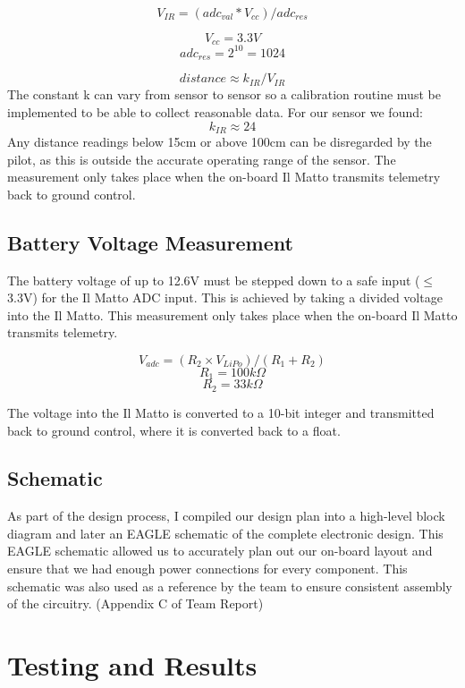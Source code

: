 \documentclass[a4paper,11pt]{article}
\begin{document}
\begin{equation}
V_{IR} = (adc_{val}*V_{cc})/adc_{res}
\label{eqn:IR Voltage}
\end{equation}

\[V_{cc} = 3.3V\]
\[adc_{res} = 2^{10} = 1024\]

\begin{equation}
distance \approx k_{IR}/V_{IR}
\label{eqn:IR Distance}
\end{equation}
The constant k can vary from sensor to sensor so a calibration routine must be implemented to be able to collect reasonable data. For our sensor we found: \[k_{IR}\approx24\] Any distance readings below 15cm or above 100cm can be disregarded by the pilot, as this is outside the accurate operating range of the sensor. The measurement only takes place when the on-board Il Matto transmits telemetry back to ground control.

\subsection{Battery Voltage Measurement}
The battery voltage of up to 12.6V must be stepped down to a safe input ($\leq$3.3V) for the Il Matto ADC input. This is achieved by taking a divided voltage into the Il Matto. This measurement only takes place when the on-board Il Matto transmits telemetry.

\begin{equation}
V_{adc} = (R_2 \times V_{LiPo})/(R_1 + R_2)
\label{eqn:battery voltage}
\end{equation}
\[ R_1 = 100k\Omega \] 
\[R_2 = 33k\Omega \]

The voltage into the Il Matto is converted to a 10-bit integer and transmitted back to ground control, where it is converted back to a float.

\subsection{Schematic}
As part of the design process, I compiled our design plan into a high-level block diagram and later an EAGLE schematic of the complete electronic design. This EAGLE schematic allowed us to accurately plan out our on-board layout and ensure that we had enough power connections for every component. This schematic was also used as a reference by the team to ensure consistent assembly of the circuitry. (Appendix C of Team Report)



\section{Testing and Results}
\end{document}
